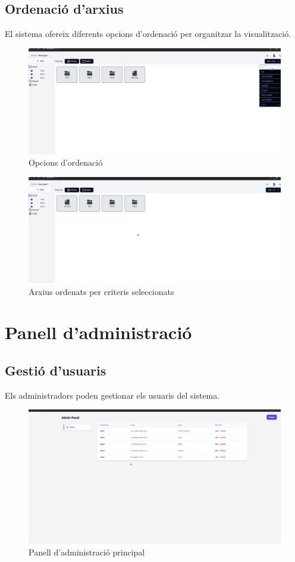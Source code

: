 \subsection{Ordenació d'arxius}

El sistema ofereix diferents opcions d'ordenació per organitzar la visualització.

\begin{figure}[H]
\centering
\includegraphics[width=0.7\linewidth]{Figures/implementacio/sort.png}
\caption{Opcions d'ordenació}
\label{fig:sort}
\end{figure}

\begin{figure}[H]
\centering
\includegraphics[width=0.7\linewidth]{Figures/implementacio/sortSuccess.png}
\caption{Arxius ordenats per criteris seleccionats}
\label{fig:sortSuccess}
\end{figure}

\section{Panell d'administració}

\subsection{Gestió d'usuaris}

Els administradors poden gestionar els usuaris del sistema.

\begin{figure}[H]
\centering
\includegraphics[width=\linewidth]{Figures/implementacio/adminPanel.png}
\caption{Panell d'administració principal}
\label{fig:adminPanel}
\end{figure}

